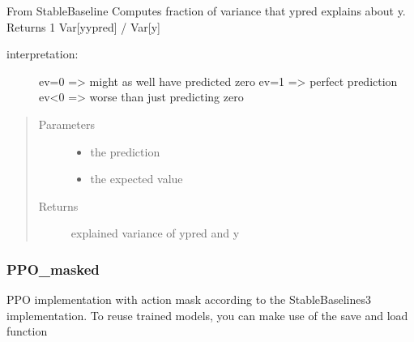 \documentclass[letterpaper,10pt,english]{sphinxmanual}
\begin{document}
\begin{fulllineitems}
\label{\detokenize{agents.reinforcement_learning:agents.reinforcement_learning.ppo.explained_variance}}
\sphinxAtStartPar
From Stable\sphinxhyphen{}Baseline
Computes fraction of variance that ypred explains about y.
Returns 1 \sphinxhyphen{} Var{[}y\sphinxhyphen{}ypred{]} / Var{[}y{]}
\begin{description}
\item[{interpretation:}] \leavevmode
\sphinxAtStartPar
ev=0  =\textgreater{}  might as well have predicted zero
ev=1  =\textgreater{}  perfect prediction
ev\textless{}0  =\textgreater{}  worse than just predicting zero

\end{description}
\begin{quote}\begin{description}
\item[{Parameters}] \leavevmode\begin{itemize}
\item {} 
\sphinxAtStartPar
{} \textendash{} the prediction

\item {} 
\sphinxAtStartPar
{} \textendash{} the expected value

\end{itemize}

\item[{Returns}] \leavevmode
\sphinxAtStartPar
explained variance of ypred and y

\end{description}\end{quote}

\end{fulllineitems}



\subsubsection{PPO\_masked}
\label{\detokenize{agents.reinforcement_learning:module-agents.reinforcement_learning.ppo_masked}}\label{\detokenize{agents.reinforcement_learning:ppo-masked}}
\sphinxAtStartPar
PPO implementation with action mask according to the StableBaselines3 implementation.
To reuse trained models, you can make use of the save and load function
\end{document}
